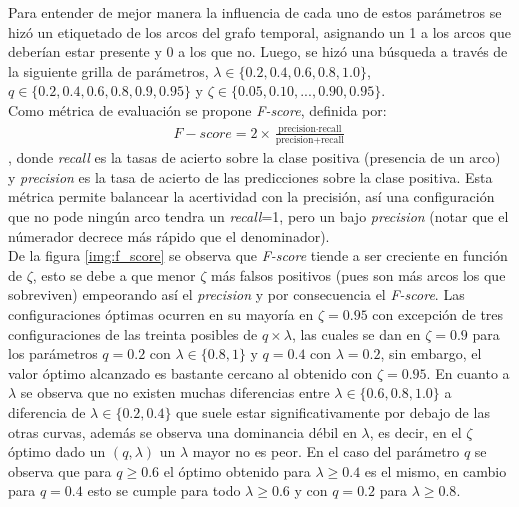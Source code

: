 \documentclass[letterpaper,12pt,oneside]{book} %
\begin{document}
Para entender de mejor manera la influencia de cada uno de estos parámetros se hizó un etiquetado de los arcos del grafo temporal, asignando un 1 a los arcos que deberían estar presente y 0 a los que no. Luego, se hizó una búsqueda a través de la siguiente grilla de parámetros, $\lambda \in \{0.2, 0.4, 0.6, 0.8, 1.0\}$, $q \in \{0.2, 0.4, 0.6, 0.8, 0.9, 0.95\}$ y $\zeta \in \{0.05, 0.10, ..., 0.90, 0.95\}$. \\

Como métrica de evaluación se propone \textit{F-score}, definida por:
\begin{align}
    F-score = 2\times \frac{\text{precision}\cdot \text{recall}}{\text{precision}+\text{recall}}
\end{align}
, donde \textit{recall} es la tasas de acierto sobre la clase positiva (presencia de un arco) y \textit{precision} es la tasa de acierto de las predicciones sobre la clase positiva. Esta métrica permite balancear la acertividad con la precisión, así una configuración que no pode ningún arco tendra un \textit{recall}=1, pero un bajo \textit{precision} (notar que el númerador decrece más rápido que el denominador). \\

De la figura \ref{img:f_score} se observa que \textit{F-score} tiende a ser creciente en función de $\zeta$, esto se debe a que menor $\zeta$ más falsos positivos (pues son más arcos los que sobreviven) empeorando así el \textit{precision} y por consecuencia el \textit{F-score}. Las configuraciones óptimas ocurren en su mayoría en $\zeta=0.95$ con excepción de tres configuraciones de las treinta posibles de $q\times \lambda$, las cuales se dan en $\zeta=0.9$ para los parámetros $q=0.2$ con $\lambda \in \{0.8, 1\}$ y $q=0.4$ con $\lambda=0.2$, sin embargo, el valor óptimo alcanzado es bastante cercano al obtenido con $\zeta=0.95$. En cuanto a $\lambda$ se observa que no existen muchas diferencias entre $\lambda\in\{0.6, 0.8, 1.0\}$ a diferencia de $\lambda \in \{0.2, 0.4\}$ que suele estar significativamente por debajo de las otras curvas, además se observa una dominancia débil en $\lambda$, es decir, en el $\zeta$ óptimo dado un $(q, \lambda)$ un $\lambda$ mayor no es peor. En el caso del parámetro $q$ se observa que para $q\geq 0.6$ el óptimo obtenido para $\lambda\geq 0.4$ es el mismo, en cambio para $q=0.4$ esto se cumple para todo $\lambda\geq 0.6$ y con $q=0.2$ para $\lambda \geq 0.8$. 
\end{document}
